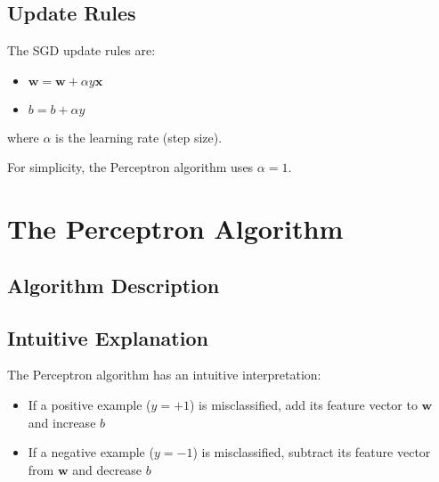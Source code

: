 \documentclass{article}
\begin{document}
\subsection{Update Rules}
The SGD update rules are:
\begin{itemize}
    \item $\mathbf{w} = \mathbf{w} + \alpha y\mathbf{x}$
    \item $b = b + \alpha y$
\end{itemize}
where $\alpha$ is the learning rate (step size).

For simplicity, the Perceptron algorithm uses $\alpha = 1$.

\section{The Perceptron Algorithm}

\subsection{Algorithm Description}

\subsection{Intuitive Explanation}
The Perceptron algorithm has an intuitive interpretation:
\begin{itemize}
    \item If a positive example ($y = +1$) is misclassified, add its feature vector to $\mathbf{w}$ and increase $b$
    \item If a negative example ($y = -1$) is misclassified, subtract its feature vector from $\mathbf{w}$ and decrease $b$
\end{itemize}
\end{document}
